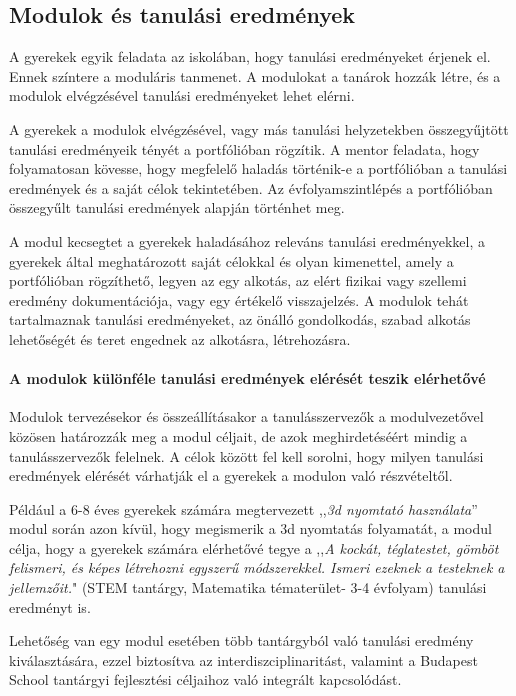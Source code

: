 \subsection{Modulok és tanulási eredmények}

A gyerekek egyik feladata az iskolában, hogy tanulási eredményeket
érjenek el. Ennek színtere a moduláris tanmenet. A modulokat a tanárok
hozzák létre, és a modulok elvégzésével tanulási eredményeket lehet
elérni.

A gyerekek a modulok elvégzésével, vagy más tanulási helyzetekben
összegyűjtött tanulási eredményeik tényét a portfólióban rögzítik. A
mentor feladata, hogy folyamatosan kövesse, hogy megfelelő haladás
történik-e a portfólióban a tanulási eredmények és a saját célok
tekintetében. Az évfolyamszintlépés a portfólióban összegyűlt tanulási
eredmények alapján történhet meg.

A modul kecsegtet a gyerekek haladásához releváns tanulási
eredményekkel, a gyerekek által meghatározott saját célokkal és olyan
kimenettel, amely a portfólióban rögzíthető, legyen az egy alkotás, az
elért fizikai vagy szellemi eredmény dokumentációja, vagy egy értékelő
visszajelzés. A modulok tehát tartalmaznak tanulási eredményeket, az
önálló gondolkodás, szabad alkotás lehetőségét és teret engednek az
alkotásra, létrehozásra.

\paragraph{A modulok különféle tanulási eredmények elérését teszik
  elérhetővé}

Modulok tervezésekor és összeállításakor a tanulásszervezők a
modulvezetővel közösen határozzák meg a modul céljait, de azok
meghirdetéséért mindig a tanulásszervezők felelnek. A célok között fel
kell sorolni, hogy milyen tanulási eredmények elérését várhatják el a
gyerekek a modulon való részvételtől.

Például a 6-8 éves gyerekek számára megtervezett ,,\emph{3d nyomtató
  használata}'' modul során azon kívül, hogy megismerik a 3d nyomtatás
folyamatát, a modul célja, hogy a gyerekek számára elérhetővé tegye a
,,\emph{A kockát, téglatestet, gömböt felismeri, és képes létrehozni
  egyszerű módszerekkel. Ismeri ezeknek a testeknek a jellemzőit.}" (STEM
tantárgy, Matematika tématerület- 3-4 évfolyam) tanulási eredményt is.

Lehetőség van egy modul esetében több tantárgyból való tanulási eredmény
kiválasztására, ezzel biztosítva az interdiszciplinaritást, valamint a
Budapest School tantárgyi fejlesztési céljaihoz való integrált
kapcsolódást.

